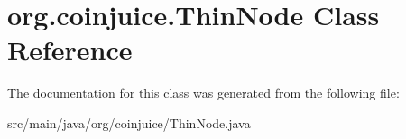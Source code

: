 \hypertarget{classorg_1_1coinjuice_1_1_thin_node}{\section{org.\-coinjuice.\-Thin\-Node Class Reference}
\label{classorg_1_1coinjuice_1_1_thin_node}
}


The documentation for this class was generated from the following file\-:\begin{DoxyCompactItemize}
\item 
src/main/java/org/coinjuice/Thin\-Node.\-java\end{DoxyCompactItemize}
